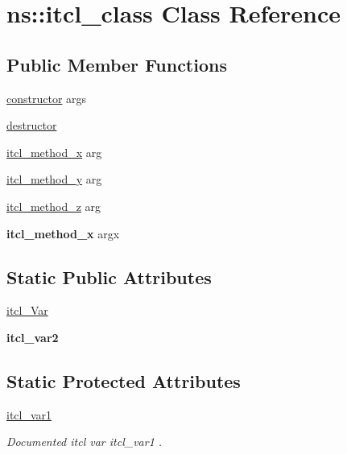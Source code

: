 \hypertarget{classns_1_1itcl__class}{\section{ns\-:\-:itcl\-\_\-class Class Reference}
\label{classns_1_1itcl__class}
}
\subsection*{Public Member Functions}
\begin{DoxyCompactItemize}
\item 
\hyperlink{classns_1_1itcl__class_a8ba2ba9d7bcb63b99a765e8f6003134b}{constructor} args
\item 
\hyperlink{classns_1_1itcl__class_ac72f3174993656391f9b54487aa4795e}{destructor}
\item 
\hyperlink{classns_1_1itcl__class_abc59160f823f3a6ec8c292c034aedbc3}{itcl\-\_\-method\-\_\-x} arg
\item 
\hyperlink{classns_1_1itcl__class_a092d0f8ed4796902e41fbeb1dfed82f1}{itcl\-\_\-method\-\_\-y} arg
\item 
\hyperlink{classns_1_1itcl__class_a13a383c766e489814960345540106cc1}{itcl\-\_\-method\-\_\-z} arg
\item 
\hypertarget{classns_1_1itcl__class_aad1f81467f2fca0dc02e527e786513a4}{{\bfseries itcl\-\_\-method\-\_\-x} argx}\label{classns_1_1itcl__class_aad1f81467f2fca0dc02e527e786513a4}

\end{DoxyCompactItemize}
\subsection*{Static Public Attributes}
\begin{DoxyCompactItemize}
\item 
\hyperlink{classns_1_1itcl__class_a8df46696ce554fed04d170932260fbb8}{itcl\-\_\-\-Var}
\item 
\hypertarget{classns_1_1itcl__class_abaf3c744194c1b3ae68fb0ba70d8786e}{{\bfseries itcl\-\_\-var2}}\label{classns_1_1itcl__class_abaf3c744194c1b3ae68fb0ba70d8786e}

\end{DoxyCompactItemize}
\subsection*{Static Protected Attributes}
\begin{DoxyCompactItemize}
\item 
\hypertarget{classns_1_1itcl__class_ae515e43ca6bb755d116416f94a13d344}{\hyperlink{classns_1_1itcl__class_ae515e43ca6bb755d116416f94a13d344}{itcl\-\_\-var1}}\label{classns_1_1itcl__class_ae515e43ca6bb755d116416f94a13d344}

\begin{DoxyCompactList}\small\item\em Documented itcl var {\ttfamily itcl\-\_\-var1} . \end{DoxyCompactList}\end{DoxyCompactItemize}


